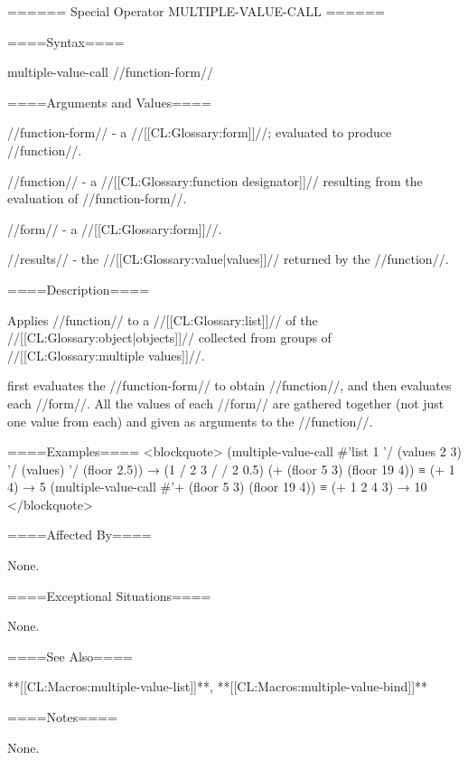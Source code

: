 ====== Special Operator MULTIPLE-VALUE-CALL ======

====Syntax====

\DefspecWithValues multiple-value-call {//function-form// } {}

====Arguments and Values====

//function-form// - a //[[CL:Glossary:form]]//; evaluated to produce //function//.

//function// - a //[[CL:Glossary:function designator]]// resulting from the evaluation of //function-form//.

//form// - a //[[CL:Glossary:form]]//.

//results// - the //[[CL:Glossary:value|values]]// returned by the //function//.

====Description====

Applies //function// to a //[[CL:Glossary:list]]// of the //[[CL:Glossary:object|objects]]// collected from groups of //[[CL:Glossary:multiple values]]//.

 first evaluates the //function-form// to obtain //function//, and then evaluates each //form//. All the values of each //form// are gathered together (not just one value from each) and given as arguments to the //function//.

====Examples==== <blockquote> (multiple-value-call #'list 1 '/ (values 2 3) '/ (values) '/ (floor 2.5)) → (1 / 2 3 / / 2 0.5) (+ (floor 5 3) (floor 19 4)) ≡ (+ 1 4) → 5 (multiple-value-call #'+ (floor 5 3) (floor 19 4)) ≡ (+ 1 2 4 3) → 10 </blockquote>

====Affected By====

None.

====Exceptional Situations====

None.

====See Also====

**[[CL:Macros:multiple-value-list]]**, **[[CL:Macros:multiple-value-bind]]**

====Notes====

None.

